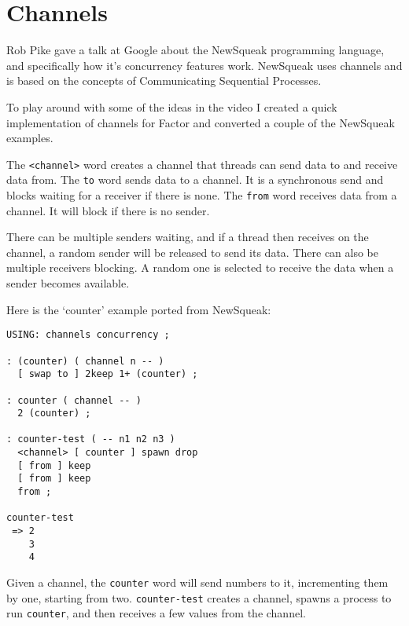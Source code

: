 \chapter{Channels}\label{channels}

Rob Pike gave a talk at Google about the NewSqueak programming
language, and specifically how it's concurrency features
work. NewSqueak uses channels and is based on the concepts of
Communicating Sequential Processes.

To play around with some of the ideas in the video I created a quick implementation of channels for Factor and converted a couple of the NewSqueak examples.


The \texttt{<channel>} word creates a channel that threads can send data to and
receive data from. The \texttt{to} word sends data to a channel. It is a
synchronous send and blocks waiting for a receiver if there is
none. The \texttt{from} word receives data from a channel. It will block if
there is no sender.

There can be multiple senders waiting, and if a thread then receives
on the channel, a random sender will be released to send its
data. There can also be multiple receivers blocking. A random one is
selected to receive the data when a sender becomes available.

Here is the `counter' example ported from NewSqueak:

\begin{verbatim}
USING: channels concurrency ;

: (counter) ( channel n -- )
  [ swap to ] 2keep 1+ (counter) ;
    
: counter ( channel -- )
  2 (counter) ;    

: counter-test ( -- n1 n2 n3 )
  <channel> [ counter ] spawn drop 
  [ from ] keep 
  [ from ] keep 
  from ;

counter-test 
 => 2
    3
    4
\end{verbatim}

Given a channel, the \texttt{counter} word will send numbers to it,
incrementing them by one, starting from two. \texttt{counter-test} creates a
channel, spawns a process to run \texttt{counter}, and then receives a few
values from the channel.

